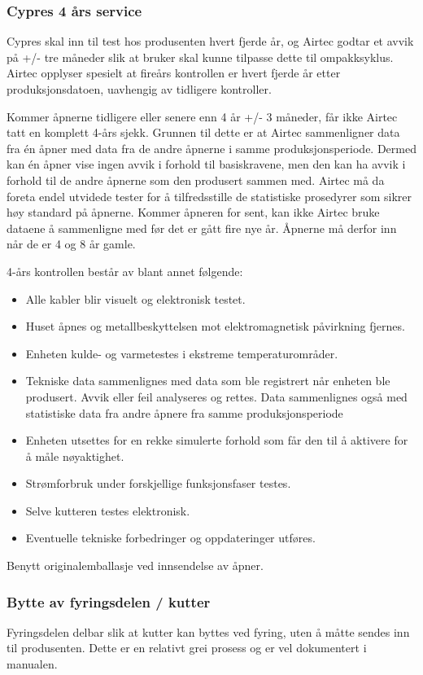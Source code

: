 \subsubsection{Cypres 4 års service}
Cypres skal inn til test hos produsenten hvert fjerde år, og Airtec godtar et avvik på +/- tre måneder slik at bruker skal kunne tilpasse dette til ompakksyklus. Airtec opplyser spesielt at fireårs kontrollen er hvert fjerde år etter produksjonsdatoen, uavhengig av tidligere kontroller.

Kommer åpnerne tidligere eller senere enn 4 år +/- 3 måneder, får ikke Airtec tatt en komplett 4-års sjekk. Grunnen til dette er at Airtec sammenligner data fra én åpner med data fra de andre åpnerne i samme produksjonsperiode. Dermed kan én åpner vise ingen avvik i forhold til basiskravene, men den kan ha avvik i forhold til de andre åpnerne som den produsert sammen med. Airtec må da foreta endel utvidede tester for å tilfredsstille de statistiske prosedyrer som sikrer høy standard på åpnerne. Kommer åpneren for sent, kan ikke Airtec bruke dataene å sammenligne med før det er gått fire nye år. Åpnerne må derfor inn når de er 4 og 8 år gamle.

4-års kontrollen består av blant annet følgende:
\begin{itemize}
\item Alle kabler blir visuelt og elektronisk testet.
\item Huset åpnes og metallbeskyttelsen mot elektromagnetisk påvirkning fjernes.
\item Enheten kulde- og varmetestes i ekstreme temperaturområder.
\item Tekniske data sammenlignes med data som ble registrert når enheten ble produsert. Avvik eller feil analyseres og rettes. Data sammenlignes også med statistiske data fra andre åpnere fra samme produksjonsperiode
\item Enheten utsettes for en rekke simulerte forhold som får den til å aktivere for å måle nøyaktighet.
\item Strømforbruk under forskjellige funksjonsfaser testes.
\item Selve kutteren testes elektronisk.
\item Eventuelle tekniske forbedringer og oppdateringer utføres.
\end{itemize}

Benytt originalemballasje ved innsendelse av åpner.

\subsubsection{Bytte av fyringsdelen / kutter}
Fyringsdelen delbar slik at kutter kan byttes ved fyring, uten å måtte sendes inn til produsenten. Dette er en relativt grei prosess og er vel dokumentert i manualen.


